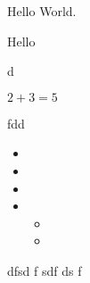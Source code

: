 \documentclass{article}
\begin{document}
Hello World.
\begin{comment}
 This is a comment too.
\end{comment}
Hello

\begin{comment}
 And so is this one
...

\end{comment}
d

  $2+3=5$

fdd

\begin{itemize}
\item\item\item\item\begin{itemize}
\item\item
\end{itemize}
\end{itemize}
dfsd
f
sdf
ds
f
\end{document}
